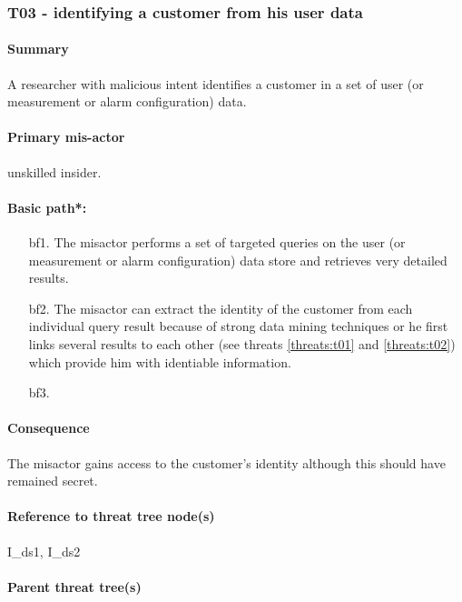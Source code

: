 \subsubsection{T03 - identifying a customer from his user data}
\label{threats:t03}

\paragraph{Summary}

\npar A researcher with malicious intent identifies a customer in a set of user
(or measurement or alarm configuration) data.

\paragraph{Primary mis-actor}

\npar unskilled insider.

\paragraph{Basic path*:}
\begin{enumerate}
	\item[bf1.] The misactor performs a set of targeted queries on the user
	(or measurement or alarm configuration) data store and retrieves very detailed
	results.
    \item[bf2.] The misactor can extract the identity of the customer from each
    individual query result because of strong data mining techniques or he first
    links several results to each other (see threats \ref{threats:t01} and
    \ref{threats:t02}) which provide him with identiable information.
    \item[bf3.]
\end{enumerate}

\paragraph{Consequence}

\npar The misactor gains access to the customer's identity although this should
have remained secret.

\paragraph{Reference to threat tree node(s)}

I\_ds1, I\_ds2

\paragraph{Parent threat tree(s)}

